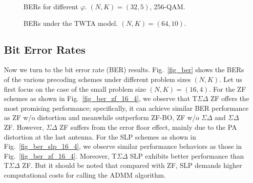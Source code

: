 \documentclass[10pt,twocolumn,twoside]{IEEEtran}
\begin{document}
\begin{figure*}
	\centering
	\caption{BERs for different ${\varphi}$. ${(N,K) = (32,5)}$, 256-QAM.}
	\label{fig_ber_sspa}
\end{figure*}

\begin{figure}
	\centering
	\caption{BERs under the TWTA model. ${(N,K) = (64,10)}$.}
	\label{fig_ber_twta}
\end{figure}





\subsection{Bit Error Rates}


Now we turn to the bit error rate (BER) results.
Fig.~\ref{fig_ber} shows the BERs of the various precoding schemes under different problem sizes $(N,K)$.
Let us first focus on the case of the small problem size $(N,K)=(16,4)$.
For the ZF schemes as shown in Fig.~\ref{fig_ber_zf_16_4},
we observe that T$\Sigma\Delta$ ZF offers the most promising performance;
specifically, it can achieve similar BER performance as ZF w/o distortion and meanwhile outperform ZF-BO, ZF w/o $\Sigma \Delta$ and $\Sigma \Delta$ ZF.
However, $\Sigma \Delta$ ZF suffers from the error floor effect, mainly due to the PA distortion at the last antenna.
For the SLP schemes as shown in Fig.~\ref{fig_ber_slp_16_4}, we observe similar performance behaviors as those in Fig.~\ref{fig_ber_zf_16_4}.
Moreover, T$\Sigma \Delta$ SLP exhibits better performance than T$\Sigma \Delta$ ZF.
But it should be noted that compared with ZF, SLP demands higher computational costs for calling the ADMM algorithm.
\end{document}
